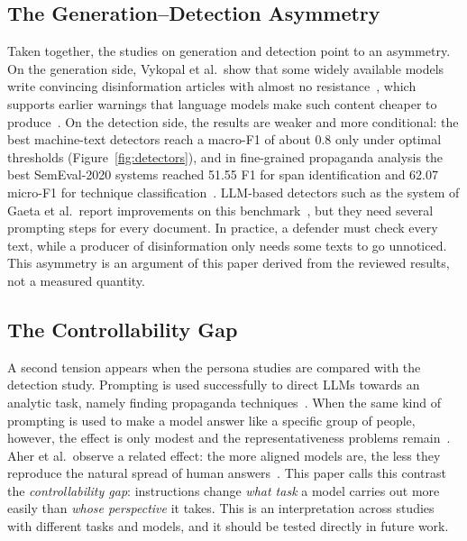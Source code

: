 \subsection{The Generation--Detection Asymmetry}
Taken together, the studies on generation and detection point to an asymmetry. On the generation side, Vykopal et al.\ show that some widely available models write convincing disinformation articles with almost no resistance~\cite{vykopal2024disinformation}, which supports earlier warnings that language models make such content cheaper to produce~\cite{buchanan2021truth}. On the detection side, the results are weaker and more conditional: the best machine-text detectors reach a macro-F1 of about 0.8 only under optimal thresholds (Figure~\ref{fig:detectors}), and in fine-grained propaganda analysis the best SemEval-2020 systems reached 51.55 F1 for span identification and 62.07 micro-F1 for technique classification~\cite{dasanmartino2020semeval}. %
LLM-based detectors such as the system of Gaeta et al.\ report improvements on this benchmark~\cite{gaeta2025towards}, but they need several prompting steps for every document. In practice, a defender must check every text, while a producer of disinformation only needs some texts to go unnoticed. This asymmetry is an argument of this paper derived from the reviewed results, not a measured quantity.

\subsection{The Controllability Gap}
A second tension appears when the persona studies are compared with the detection study. Prompting is used successfully to direct LLMs towards an analytic task, namely finding propaganda techniques~\cite{gaeta2025towards}. When the same kind of prompting is used to make a model answer like a specific group of people, however, the effect is only modest and the representativeness problems remain~\cite{santurkar2023whose}. Aher et al.\ observe a related effect: the more aligned models are, the less they reproduce the natural spread of human answers~\cite{aher2023using}. This paper calls this contrast the \emph{controllability gap}: instructions change \emph{what task} a model carries out more easily than \emph{whose perspective} it takes. This is an interpretation across studies with different tasks and models, and it should be tested directly in future work.
